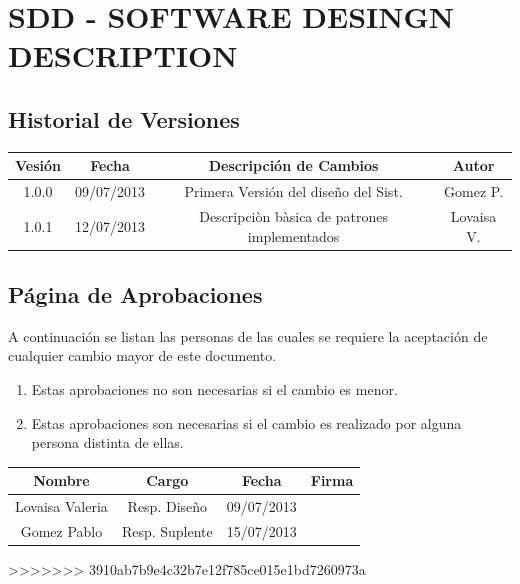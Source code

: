 \chapter{\textcolor[gray]{.8}{SDD - SOFTWARE DESINGN DESCRIPTION}}
\newpage
\section{\textcolor[gray]{.2}{Historial de Versiones}}
\begin{table}[!h]
\begin{center}
\begin{tabular}{|c|c|c|c|}
\hline
\rowcolor[gray]{.8} Vesión & Fecha & Descripción de Cambios & Autor\\
\hline
1.0.0 & 09/07/2013 & Primera Versión del diseño del Sist. & Gomez P.\\
\hline
1.0.1 & 12/07/2013 & Descripciòn bàsica de patrones implementados & Lovaisa V.\\
\hline
\end{tabular}
\end{center}
\end{table}
\newpage

\section{\textcolor[gray]{.2}{Página de Aprobaciones}}
A continuación se listan las personas de las cuales se requiere la aceptación de
cualquier cambio mayor de este documento.
\begin{enumerate}
  \item Estas aprobaciones no son necesarias si el cambio es menor.
  \item Estas aprobaciones son necesarias si el cambio es realizado por alguna
  persona distinta de ellas.
\end{enumerate}
\begin{table}[!h]
\begin{center}
\begin{tabular}{|c|c|c|c|}
\hline
\rowcolor[gray]{.8} Nombre & Cargo & Fecha & Firma\\
\hline
Lovaisa Valeria & Resp. Diseño & 09/07/2013 & \\
\hline
Gomez Pablo & Resp. Suplente & 15/07/2013 & \\
\hline
\end{tabular}
\end{center}
\end{table}
>>>>>>> 3910ab7b9e4c32b7e12f785ce015e1bd7260973a

